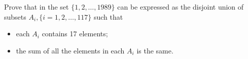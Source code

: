 Prove that in the set $ \{1,2, \ldots, 1989\}$ can be expressed as the disjoint union of subsets $ A_i, \{i = 1,2, \ldots, 117\}$ such that

\begin{itemize}
	\item each $ A_i$ contains 17 elements;
	\item the sum of all the elements in each $ A_i$ is the same.
\end{itemize}
